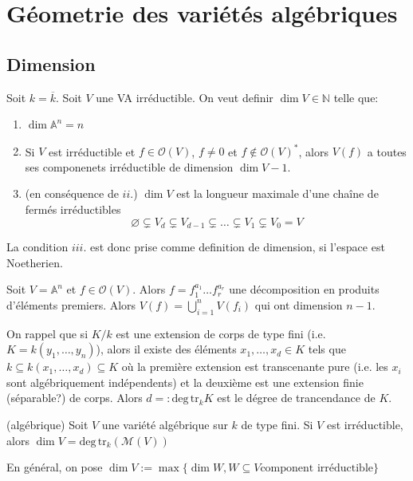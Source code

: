 \chapter{Géometrie des variétés algébriques}

\section{Dimension}

Soit \(k = \overline{k}\). Soit \(V\) une VA irréductible. On veut definir
\(\dim V \in \mathbb{N}\) telle que:
\begin{enumerate}[label = \roman*.]
    \item \(\dim \mathbb{A}^{n} = n\) 
    \item Si \(V\) est irréductible et \(f \in \mathcal{O}{(V)}\), \(f \neq 0 \)
        et \(f \not\in  \mathcal{O}{(V)}^{*}\), alors \(V{(f)}\) a toutes ses
        componenets irréductible de dimension \(\dim V - 1\).
    \item (en conséquence de \(ii.\)) \(\dim V\) est la longueur maximale d'une
        chaîne de fermés irréductibles
        \[
          \varnothing \subsetneq V_d \subsetneq V_{d-1} \subsetneq \dots
          \subsetneq V_{1} \subsetneq V_{0} = V
        \]
\end{enumerate}

La condition \(iii.\) est donc prise comme definition de dimension, si l'espace
est Noetherien.

\begin{example}[de ii.]
    Soit \(V = \mathbb{A}^{n}\) et \(f \in \mathcal{O}{(V)}\). Alors \(f =
    f_{1}^{a_{1}} \dots f_r^{a_r}\) une décomposition en produits d'éléments
    premiers. Alors \(V{(f)} = \bigcup_{i=1} ^{n} V{(f_{i})}\) qui ont dimension
    \(n-1\).
\end{example}

On rappel que si \(K / k \) est une extension de corps de type fini (i.e. \(K =
k{(y_{1}, \dots, y_{n})}\)), alors il existe des éléments \(x_{1}, \dots, x_d
\in K\) tels que \( k \subseteq k{(x_{1}, \dots, x_d)} \subseteq K  \) où la
première extension est transcenante pure (i.e. les \(x_{i}\) sont algébriquement
indépendents) et la deuxième est une extension finie (séparable?) de corps.
Alors \(d =: \mathrm{deg}\,\mathrm{tr}_k K\) est le dégree de trancendance de
\(K\).

\begin{definition}{(algébrique)}
    Soit \(V\) une variété algébrique sur \(k\) de type fini. Si \(V\) est
    irréductible, alors \(\dim V = \mathrm{deg}\,\mathrm{tr}_k {(\mathcal{M}{(V)})}\) 

    En général, on pose \(\dim V := \max \{\dim W, W \subseteq V \text{
    component irréductible} \} \) 
\end{definition}

